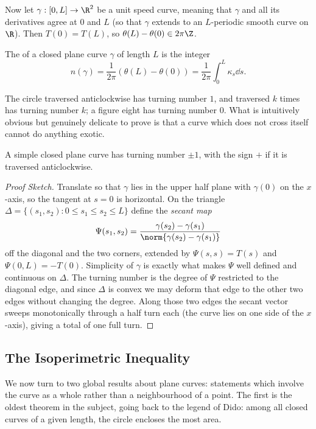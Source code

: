 Now let $\gamma: [0, L] \rightarrow \R^2$ be a  unit speed curve, meaning that $\gamma$ and all its derivatives agree at $0$ and $L$ (so that $\gamma$ extends to an $L$-periodic smooth curve on $\R$). Then $T(0) = T(L)$, so $\theta(L) - \theta(0) \in 2\pi\Z$.

\begin{definition}
    The  of a closed plane curve $\gamma$ of length $L$ is the integer
    $$
    n(\gamma) = \frac{1}{2\pi}\left(\theta(L) - \theta(0)\right) = \frac{1}{2\pi}\int_0^L \kappa_s \dd s.
    $$
\end{definition}

The circle traversed anticlockwise has turning number $1$, and traversed $k$ times has turning number $k$; a figure eight has turning number $0$. What is intuitively obvious but genuinely delicate to prove is that a curve which does not cross itself cannot do anything exotic.

\begin{theorem}
    A simple closed plane curve has turning number $\pm 1$, with the sign $+$ if it is traversed anticlockwise.
\end{theorem}
\begin{proof}[Proof Sketch]
    Translate so that $\gamma$ lies in the upper half plane with $\gamma(0)$ on the $x$-axis, so the tangent at $s = 0$ is horizontal. On the triangle $\Delta = \{(s_1, s_2) : 0 \leq s_1\leq s_2 \leq L\}$ define the \emph{secant map}
    $$
    \Psi(s_1,s_2) = \frac{\gamma(s_2)-\gamma(s_1)}{\norm{\gamma(s_2)-\gamma(s_1)}}
    $$
    off the diagonal and the two corners, extended by $\Psi(s,s) = T(s)$ and $\Psi(0,L) = -T(0)$. Simplicity of $\gamma$ is exactly what makes $\Psi$ well defined and continuous on $\Delta$. The turning number is the degree of $\Psi$ restricted to the diagonal edge, and since $\Delta$ is convex we may deform that edge to the other two edges without changing the degree. Along those two edges the secant vector sweeps monotonically through a half turn each (the curve lies on one side of the $x$-axis), giving a total of one full turn.
\end{proof}

\subsection{The Isoperimetric Inequality}

We now turn to two global results about plane curves: statements which involve the curve as a whole rather than a neighbourhood of a point. The first is the oldest theorem in the subject, going back to the legend of Dido: among all closed curves of a given length, the circle encloses the most area.

